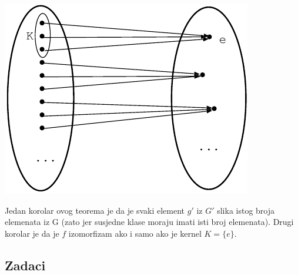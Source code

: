 \centerline{\includegraphics[scale=1.0]{pics/homo3}}


Jedan korolar ovog teorema je da je svaki element $g'$ iz $G'$ slika
istog broja elemenata iz G (zato jer susjedne klase moraju imati
isti broj elemenata). Drugi korolar je da je $f$ izomorfizam ako i
samo ako je kernel $K=\{e\}$.


\subsection*{Zadaci}

